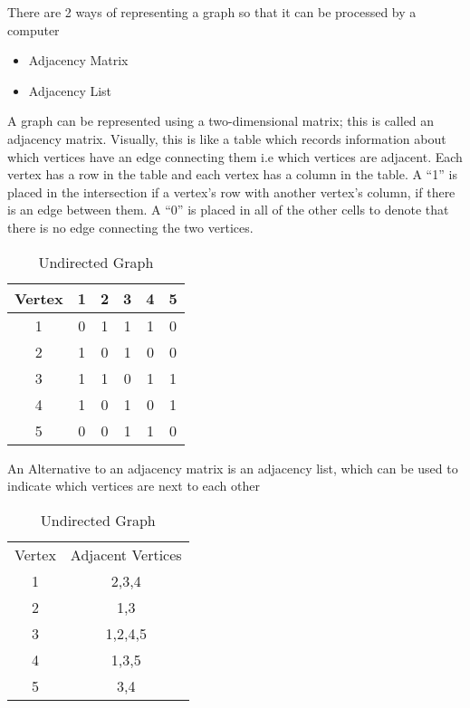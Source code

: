   There are 2 ways of representing a graph so that it can be processed by a computer
  \begin{itemize}
  	\item Adjacency Matrix
  	\item Adjacency List
  \end{itemize}
  
  A graph can be represented using a two-dimensional matrix; this is called an adjacency matrix. Visually, this is like a table which records information about which vertices have an edge connecting them i.e which vertices are adjacent. Each vertex has a row in the table and each vertex has a column in the table. A ``1'' is placed in the intersection if a vertex's row with another vertex's column, if there is an edge between them. A ``0'' is placed in all of the other cells to denote that there is no edge connecting the two vertices.
  \begin{table}[h]
  	\caption{Undirected Graph}
  	\begin{tabular}{c | c c c c c}
  		Vertex	&	1	&	2	&	3	&	4	&	5 	\\ \hline
  		1		&	0	&	1	&	1	&	1	&	0	\\
  		2		&	1	&	0	&	1	&	0	&	0	\\
  		3		&	1	&	1	&	0	&	1	&	1	\\
  		4		&	1	&	0	&	1	&	0	&	1	\\
  		5		&	0	&	0	&	1	&	1	&	0	\\
  	\end{tabular}
  \end{table}


  An Alternative to an adjacency matrix is an adjacency list, which can be used to indicate which vertices are next to each other
  \begin{table}[h]
  	\caption{Undirected Graph}
  	\begin{tabular}{cc}
  		Vertex	&	Adjacent Vertices \\
  		1		&	2,3,4	\\
  		2		&	1,3	\\
  		3		&	1,2,4,5	\\
  		4		&	1,3,5	\\
  		5		&	3,4	\\
  	\end{tabular}
  \end{table}


